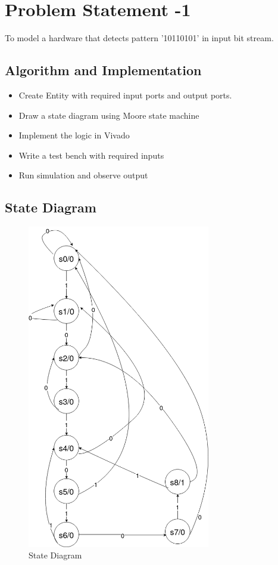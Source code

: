 \documentclass[12pt]{article}
\begin{document}
  \section{Problem Statement -1}
 To model a hardware that detects pattern '10110101' in input bit stream.
  
  \subsection{Algorithm and Implementation}
  \begin{itemize}
  \item Create Entity with required input ports and output ports.
  \item Draw a state diagram using Moore state machine
  \item Implement the logic in Vivado
  \item Write a test bench with required inputs
  \item Run simulation and observe output
  \end{itemize}
  \newpage
   \subsection{State Diagram}
   \begin{figure}[h!]
   \centering
   \includegraphics[width=80mm]{Image1.png}
   \caption{State Diagram}
    \label{fig:State Diagram}
   \end{figure}
  
\end{document}
